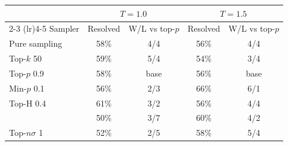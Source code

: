 \begin{tabular}{lcccc}
\toprule
 & \multicolumn{2}{c}{$T{=}1.0$} & \multicolumn{2}{c}{$T{=}1.5$} \\
\cmidrule(lr){2-3} \cmidrule(lr){4-5}
Sampler & Resolved & W/L vs top-$p$ & Resolved & W/L vs top-$p$ \\
\midrule
Pure sampling & 58\% & 4/4 & 56\% & 4/4 \\
Top-$k$ 50 & 59\% & 5/4 & 54\% & 3/4 \\
Top-$p$ 0.9 & 58\% & base & 56\% & base \\
Min-$p$ 0.1 & 56\% & 2/3 & 66\% & 6/1 \\
Top-H 0.4 & 61\% & 3/2 & 56\% & 4/4 \\
\pless{} & 50\% & 3/7 & 60\% & 4/2 \\
Top-$n\sigma$ 1 & 52\% & 2/5 & 58\% & 5/4 \\
\bottomrule
\end{tabular}

